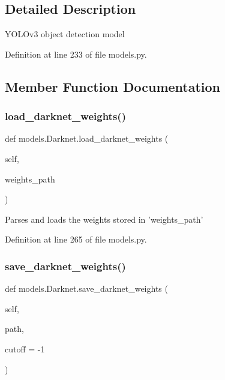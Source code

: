 \subsection{Detailed Description}
\begin{DoxyVerb}YOLOv3 object detection model\end{DoxyVerb}
 

Definition at line 233 of file models.\+py.



\subsection{Member Function Documentation}
\mbox{\label{classmodels_1_1Darknet_a04eb7191a6449fa1971d2fc48f6fa2c2}} 
\subsubsection{\texorpdfstring{load\+\_\+darknet\+\_\+weights()}{load\_darknet\_weights()}}
{\footnotesize\ttfamily def models.\+Darknet.\+load\+\_\+darknet\+\_\+weights (\begin{DoxyParamCaption}\item[{}]{self,  }\item[{}]{weights\+\_\+path }\end{DoxyParamCaption})}

\begin{DoxyVerb}Parses and loads the weights stored in 'weights_path'\end{DoxyVerb}
 

Definition at line 265 of file models.\+py.

\mbox{\label{classmodels_1_1Darknet_a791dbab6aec1d5d4991c0f387f3f0336}} 
\subsubsection{\texorpdfstring{save\+\_\+darknet\+\_\+weights()}{save\_darknet\_weights()}}
{\footnotesize\ttfamily def models.\+Darknet.\+save\+\_\+darknet\+\_\+weights (\begin{DoxyParamCaption}\item[{}]{self,  }\item[{}]{path,  }\item[{}]{cutoff = {\ttfamily -\/1} }\end{DoxyParamCaption})}

